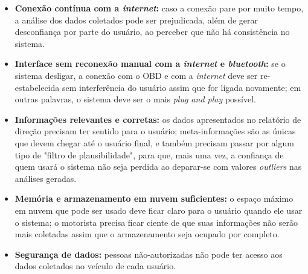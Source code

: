 \begin{itemize}
    \item \textbf{Conexão contínua com a \textit{internet}:} caso a conexão pare por muito tempo, a análise dos dados coletados pode ser prejudicada, além de gerar desconfiança por parte do usuário, ao perceber que não há consistência no sistema.
    
    \item \textbf{Interface sem reconexão manual com a \textit{internet} e \textit{bluetooth}:} se o sistema desligar, a conexão com o OBD e com a \textit{internet} deve ser re-estabelecida sem interferência do usuário assim que for ligada novamente; em outras palavras, o sistema deve ser o mais \textit{plug and play} possível.
    
    \item \textbf{Informações relevantes e corretas:} os dados apresentados no relatório de direção precisam ter sentido para o usuário; meta-informações são as únicas que devem chegar até o usuário final, e também precisam passar por algum tipo de "filtro de plausibilidade", para que, mais uma vez, a confiança de quem usará o sistema não seja perdida ao deparar-se com valores \textit{outliers} nas análises geradas.
    
    \item \textbf{Memória e armazenamento em nuvem suficientes:} o espaço máximo em nuvem que pode ser usado deve ficar claro para o usuário quando ele usar o sistema; o motorista precisa ficar ciente de que suas informações não serão mais coletadas assim que o armazenamento seja ocupado por completo.
    
    \item \textbf{Segurança de dados:} pessoas não-autorizadas não pode ter acesso aos dados coletados no veículo de cada usuário.
\end{itemize}



